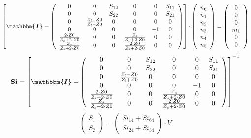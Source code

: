 \[ \left[ \boldsymbol{\mathbbm{I}}  - \left(\begin{array}{cccccc} 0 &
0 & S_{12} & 0 & 0 & S_{11} \\ 0 & 0 & S_{22} & 0 & 0 & S_{21} \\ 0 &
\frac{ Z_l -Z0}{ Z_l +Z0} & 0 & 0 & 0 & 0 \\ 0 & 0 & 0 & 0 & -1 & 0 \\
\frac{2\cdot Z0}{Z_s+2\cdot Z0} & 0 & 0 & \frac{Z_s}{Z_s+2\cdot Z0} &
0 & 0 \\ \frac{Z_s}{Z_s+2\cdot Z0} & 0 & 0 & \frac{2\cdot
Z0}{Z_s+2\cdot Z0} & 0 & 0 \end{array}\right)\right] \cdot
\left(\begin{array}{c} n_{6} \\ n_{1} \\ n_{2} \\ n_{3} \\ n_{4} \\
n_{5} \end{array}\right) = \left(\begin{array}{c} 0 \\ 0 \\ 0 \\ m_{1}
\\ 0 \\ 0 \end{array}\right) \]
\[ \mathbf{Si} = \left[ \boldsymbol{\mathbbm{I}}  -
\left(\begin{array}{cccccc} 0 & 0 & S_{12} & 0 & 0 & S_{11} \\ 0 & 0 &
S_{22} & 0 & 0 & S_{21} \\ 0 & \frac{ Z_l -Z0}{ Z_l +Z0} & 0 & 0 & 0 &
0 \\ 0 & 0 & 0 & 0 & -1 & 0 \\ \frac{2\cdot Z0}{Z_s+2\cdot Z0} & 0 & 0
& \frac{Z_s}{Z_s+2\cdot Z0} & 0 & 0 \\ \frac{Z_s}{Z_s+2\cdot Z0} & 0 &
0 & \frac{2\cdot Z0}{Z_s+2\cdot Z0} & 0 & 0 \end{array}\right)
\right]^{-1} \]
\[ \left(\begin{array}{c} S_{1} \\ S_{2}
\end{array}\right)=\left(\begin{array}{c} Si_{14} + Si_{64} \\ Si_{24}
+ Si_{34} \end{array}\right)\cdot V \]
